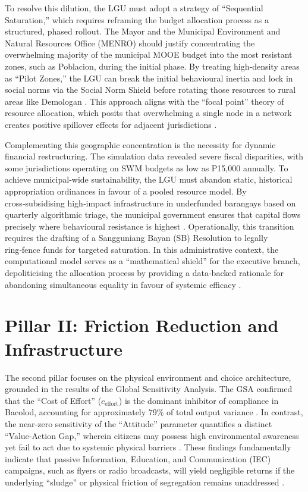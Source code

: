 To resolve this dilution, the LGU must adopt a strategy of “Sequential Saturation,” which requires reframing the budget allocation process as a structured, phased rollout. The Mayor and the Municipal Environment and Natural Resources Office (MENRO) should justify concentrating the overwhelming majority of the municipal MOOE budget into the most resistant zones, such as Poblacion, during the initial phase. By treating high‑density areas as “Pilot Zones,” the LGU can break the initial behavioural inertia and lock in social norms via the Social Norm Shield before rotating those resources to rural areas like Demologan \citep{Zheng2022b}. This approach aligns with the “focal point” theory of resource allocation, which posits that overwhelming a single node in a network creates positive spillover effects for adjacent jurisdictions \citep{Ostrom2010}.

Complementing this geographic concentration is the necessity for dynamic financial restructuring. The simulation data revealed severe fiscal disparities, with some jurisdictions operating on SWM budgets as low as P15,000 annually. To achieve municipal‑wide sustainability, the LGU must abandon static, historical appropriation ordinances in favour of a pooled resource model. By cross‑subsidising high‑impact infrastructure in underfunded barangays based on quarterly algorithmic triage, the municipal government ensures that capital flows precisely where behavioural resistance is highest \citep{Abdallah2021, Turchetta2019}. Operationally, this transition requires the drafting of a Sangguniang Bayan (SB) Resolution to legally ring‑fence funds for targeted saturation. In this administrative context, the computational model serves as a “mathematical shield” for the executive branch, depoliticising the allocation process by providing a data‑backed rationale for abandoning simultaneous equality in favour of systemic efficacy \citep{Nishimura2022}.

\section{Pillar II: Friction Reduction and Infrastructure}
\label{sec:pillar2}

The second pillar focuses on the physical environment and choice architecture, grounded in the results of the Global Sensitivity Analysis. The GSA confirmed that the “Cost of Effort” (\(c_{\text{effort}}\)) is the dominant inhibitor of compliance in Bacolod, accounting for approximately 79\% of total output variance \citep{Yazawa2025}. In contrast, the near‑zero sensitivity of the “Attitude” parameter quantifies a distinct “Value‑Action Gap,” wherein citizens may possess high environmental awareness yet fail to act due to systemic physical barriers \citep{Blake1999, Zhao2022}. These findings fundamentally indicate that passive Information, Education, and Communication (IEC) campaigns, such as flyers or radio broadcasts, will yield negligible returns if the underlying “sludge” or physical friction of segregation remains unaddressed \citep{Sunstein2019, Moeini2023}.


